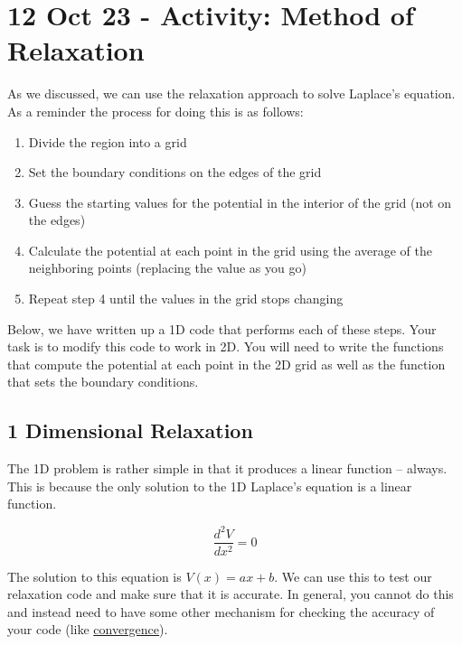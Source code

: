 \section{12 Oct 23 - Activity: Method of
Relaxation}\label{oct-23---activity-method-of-relaxation}

As we discussed, we can use the relaxation approach to solve Laplace's
equation. As a reminder the process for doing this is as follows:

\begin{enumerate}
\def\labelenumi{\arabic{enumi}.}
\tightlist
\item
  Divide the region into a grid
\item
  Set the boundary conditions on the edges of the grid
\item
  Guess the starting values for the potential in the interior of the
  grid (not on the edges)
\item
  Calculate the potential at each point in the grid using the average of
  the neighboring points (replacing the value as you go)
\item
  Repeat step 4 until the values in the grid stops changing
\end{enumerate}

Below, we have written up a 1D code that performs each of these steps.
Your task is to modify this code to work in 2D. You will need to write
the functions that compute the potential at each point in the 2D grid as
well as the function that sets the boundary conditions.

\begin{Shaded}
\begin{Highlighting}[]
\end{Highlighting}
\end{Shaded}

\subsection{1 Dimensional Relaxation}\label{dimensional-relaxation}

The 1D problem is rather simple in that it produces a linear function --
always. This is because the only solution to the 1D Laplace's equation
is a linear function.

\[\frac{d^2V}{dx^2} = 0\]

The solution to this equation is \(V(x) = ax + b\). We can use this to
test our relaxation code and make sure that it is accurate. In general,
you cannot do this and instead need to have some other mechanism for
checking the accuracy of your code (like
\href{https://en.wikipedia.org/wiki/Rate_of_convergence}{convergence}).

